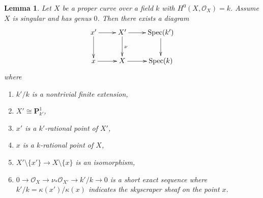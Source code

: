 \documentclass[10pt,a4paper]{amsart}
\theoremstyle{plain}
\newtheorem{lemma}[subsection]{Lemma}
\theoremstyle{definition}
\theoremstyle{remark}
\numberwithin{equation}{subsection}
\def\Spec{\mathop{\mathrm{Spec}}}
\begin{document}
\begin{lemma}
\label{lemma-genus-zero-singular}
Let $X$ be a proper curve over a field $k$ with $H^0(X, \mathcal{O}_X) = k$.
Assume $X$ is singular and has genus $0$. Then there exists a diagram
$$
\xymatrix{
x' \ar[d] \ar[r] & X' \ar[d]^\nu \ar[r] & \Spec(k') \ar[d] \\
x \ar[r] & X \ar[r] & \Spec(k)
}
$$
where
\begin{enumerate}
\item $k'/k$ is a nontrivial finite extension,
\item $X' \cong \mathbf{P}^1_{k'}$,
\item $x'$ is a $k'$-rational point of $X'$,
\item $x$ is a $k$-rational point of $X$,
\item $X' \setminus \{x'\} \to X \setminus \{x\}$ is an isomorphism,
\item $0 \to \mathcal{O}_X \to \nu_*\mathcal{O}_{X'} \to k'/k \to 0$
is a short exact sequence
where $k'/k = \kappa(x')/\kappa(x)$ indicates the skyscraper sheaf
on the point $x$.
\end{enumerate}
\end{lemma}
\end{document}
